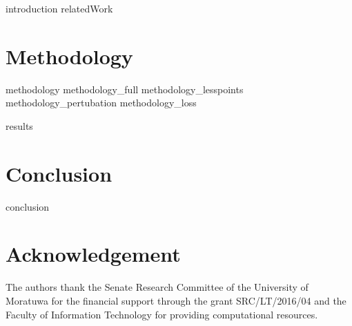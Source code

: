 \documentclass[10pt,twocolumn,letterpaper]{article}
\begin{document}
{introduction}
{relatedWork}


\section{Methodology} \label{sec:meth_overview}

{methodology}
{methodology_full}
{methodology_lesspoints}
{methodology_pertubation}
{methodology_loss}


{results}
\section{Conclusion} \label{sec:conclusion}
{conclusion}
\section{Acknowledgement}
The authors thank the Senate Research Committee of the University of Moratuwa for the financial support through the grant SRC/LT/2016/04 and the Faculty of Information Technology for providing computational resources.


%
%


%
%
\end{document}
